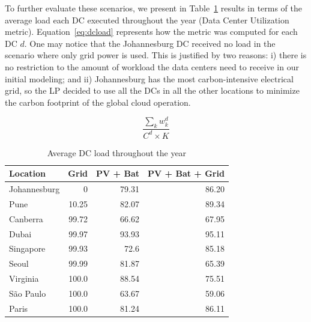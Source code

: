 To further evaluate these scenarios, we present in Table~\ref{tab:dcutilization} results in terms of the average load each DC executed throughout the year (Data Center Utilization metric). Equation~\eqref{eq:dcload} represents how the metric was computed for each DC $d$. One may notice that the Johannesburg DC received no load in the scenario where only grid power is used. This is justified by two reasons: i) there is no restriction to the amount of workload the data centers need to receive in our initial modeling; and ii) Johannesburg has the most carbon-intensive electrical grid, so the LP decided to use all the DCs in all the other locations to minimize the carbon footprint of the global cloud operation.

\begin{equation}\label{eq:dcload}
\frac{\sum_k w^d_k} {C^d \times K }
\end{equation}


\begin{table}[h]
  
  \caption{Average DC load throughout the year }\label{tab:dcutilization} \centering

  \begin{tabular}{|l|r|r|r|}
   \hline
    
  \textbf{Location} &   \textbf{Grid} & \textbf{PV + Bat} & \textbf{PV + Bat + Grid}  \\
  \hline
  Johannesburg & 0 & 79.31  & 86.20  \\
  \hline
  Pune  & 10.25 &  82.07 & 89.34   \\
  \hline
  Canberra  & 99.72 & 66.62 & 67.95 \\
  \hline
  Dubai   & 99.97 & 93.93 & 95.11   \\
  \hline
  Singapore & 99.93 & 72.6  & 85.18 \\
  \hline     
  Seoul    & 99.99 & 81.87 & 65.39      \\
  \hline
  Virginia   & 100.0 & 88.54 & 75.51 \\
  \hline
  São Paulo   & 100.0 & 63.67 & 59.06 \\
  \hline 
  Paris    & 100.0 & 81.24  &  86.11    \\
  \hline  

\end{tabular}  
\end{table}


